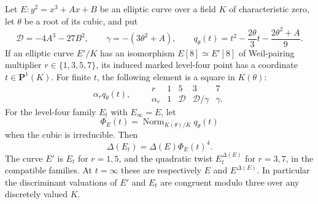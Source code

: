 \begin{lemma}
\label{lem:B-RD48-models}
Let $E:y^2=x^3+A x+B$ be an elliptic curve over a field $K$ of
characteristic zero, let $\theta$ be a root of its cubic, and put
\[
 \mathcal D=-4A^3-27B^2,\qquad
 \gamma=-(3\theta^2+A),\qquad
 q_\theta(t)=t^2-\frac{2\theta}{3}t-
                         \frac{2\theta^2+A}{9}.          \tag{B-RD48.1}
\]
If an elliptic curve $E'/K$ has an isomorphism $E[8]\simeq E'[8]$
of Weil-pairing multiplier $r\in\{1,3,5,7\}$, its induced
marked level-four point has a coordinate $t\in\mathbf P^1(K)$.
For finite $t$, the following element is a square in $K(\theta)$:
\[
 \alpha_r q_\theta(t),\qquad
 \begin{array}{c|rrrr}
 r&1&5&3&7\\\hline
 \alpha_r&1&\mathcal D&\mathcal D/\gamma&\gamma.
 \end{array}                                             \tag{B-RD48.2}
\]
For the level-four family $E_t$ with $E_\infty=E$, let
\[
 \Phi_E(t)=\operatorname{Norm}_{K(\theta)/K}q_\theta(t)
                                                               \tag{B-RD48.3}
\]
when the cubic is irreducible. Then
\[
                  \Delta(E_t)=\Delta(E)\Phi_E(t)^4.      \tag{B-RD48.4}
\]
The curve $E'$ is $E_t$ for $r=1,5$, and the quadratic twist
$E_t^{\Delta(E)}$ for $r=3,7$, in the compatible families.
At $t=\infty$ these are respectively $E$ and $E^{\Delta(E)}$.
In particular the discriminant valuations of $E'$ and $E_t$
are congruent modulo three over any discretely valued $K$.
\end{lemma}
